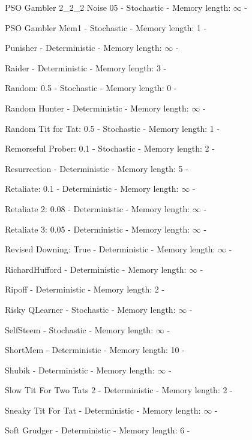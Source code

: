 \item PSO Gambler 2\_2\_2 Noise 05 - Stochastic - Memory length: \(\infty\) - \cite{Knight2018}
\item PSO Gambler Mem1 - Stochastic - Memory length: 1 - \cite{Knight2018}
\item Punisher - Deterministic - Memory length: \(\infty\) - \cite{Knight2018}
\item Raider - Deterministic - Memory length: 3 - \cite{Ashlock2014}
\item Random: 0.5 - Stochastic - Memory length: 0 - \cite{Tzafestas2000, Axelrod1980}
\item Random Hunter - Deterministic - Memory length: \(\infty\) - \cite{Knight2018}
\item Random Tit for Tat: 0.5 - Stochastic - Memory length: 1 - \cite{Knight2018}
\item Remorseful Prober: 0.1 - Stochastic - Memory length: 2 - \cite{Li2011}
\item Resurrection - Deterministic - Memory length: 5 - \cite{Eckhart2015}
\item Retaliate: 0.1 - Deterministic - Memory length: \(\infty\) - \cite{Knight2018}
\item Retaliate 2: 0.08 - Deterministic - Memory length: \(\infty\) - \cite{Knight2018}
\item Retaliate 3: 0.05 - Deterministic - Memory length: \(\infty\) - \cite{Knight2018}
\item Revised Downing: True - Deterministic - Memory length: \(\infty\) - \cite{Axelrod1980}
\item RichardHufford - Deterministic - Memory length: \(\infty\) - \cite{Axelrod1980b}
\item Ripoff - Deterministic - Memory length: 2 - \cite{Ashlock2008}
\item Risky QLearner - Stochastic - Memory length: \(\infty\) - \cite{Knight2018}
\item SelfSteem - Stochastic - Memory length: \(\infty\) - \cite{Andre2013}
\item ShortMem - Deterministic - Memory length: 10 - \cite{Andre2013}
\item Shubik - Deterministic - Memory length: \(\infty\) - \cite{Axelrod1980}
\item Slow Tit For Two Tats 2 - Deterministic - Memory length: 2 - \cite{Prison1998}
\item Sneaky Tit For Tat - Deterministic - Memory length: \(\infty\) - \cite{Knight2018}
\item Soft Grudger - Deterministic - Memory length: 6 - \cite{Li2011}

